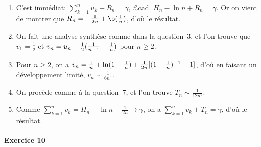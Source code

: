\documentclass{yann}
\newcommand\Exo[1]{\paragraph{Exercice #1}}
\begin{document}
\begin{enumerate}
\item
  C'est immédiat: $∑_{k=1}^n u_k + R_n = γ$, £cad. $H_n - \ln n + R_n = γ$.
  Or on vient de montrer que $R_n = -\frac{1}{2n} + \o\pa{\frac1n}$, d'où le résultat.

\item
  On fait une analyse-synthèse comme dans la question~3,
  et l'on trouve que $v_1 = \frac12$ et $v_n = u_n + \frac12({ \frac{1}{n-1} - \frac{1}{n}  })$
  pour $n≥2$.

\item
Pour $n ≥2$, on a
  $v_n = \frac1n + \ln({1-\frac1n}) + \frac{1}{2n}[{ ({1-\frac1n})^{-1} - 1 }]$,
  d'où en faisant un développement limité, $v_n \sim \frac{1}{6n^3}$.

\item
On procède comme à la question~7, et l'on trouve $T_n \sim \frac{1}{12n^2}$.

\item
Comme $∑_{k=1}^n v_k = H_n - \ln n - \frac{1}{2n} \to γ$,
  on a $∑_{k=1}^n v_k + T_n = γ$, d'où le résultat.

\end{enumerate}

\Exo{10}
\end{document}
